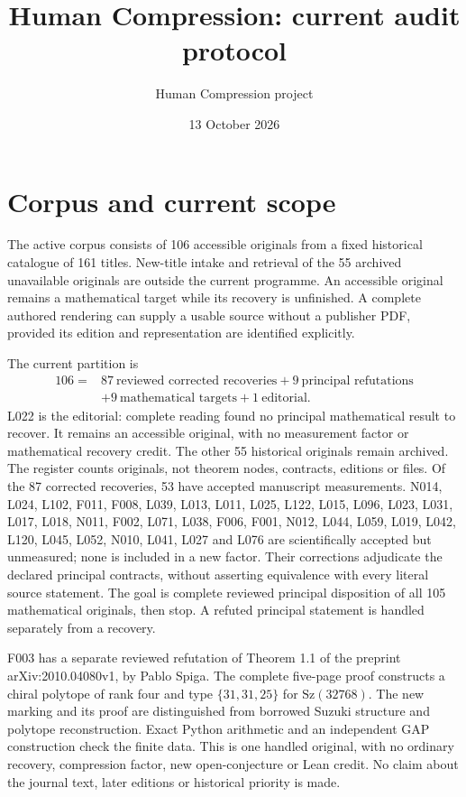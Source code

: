 \documentclass[11pt,a4paper]{article}
\title{Human Compression: current audit protocol}
\author{Human Compression project}
\date{13 October 2026}
\begin{document}
\maketitle

\section{Corpus and current scope}

The active corpus consists of 106 accessible originals from a fixed historical
catalogue of 161 titles. New-title intake and retrieval of the 55 archived
unavailable originals are outside the current programme. An accessible original
remains a mathematical target while its recovery is unfinished. A complete
authored rendering can supply a usable source without a publisher PDF, provided
its edition and representation are identified explicitly.

The current partition is
\[
\begin{aligned}
106={}&87\ \text{reviewed corrected recoveries}+9\ \text{principal refutations}\\
      &+9\ \text{mathematical targets}+1\ \text{editorial}.
\end{aligned}
\]
L022 is the editorial: complete reading found no principal mathematical result
to recover. It remains an accessible original, with no measurement factor or
mathematical recovery credit. The other 55 historical originals remain archived.
The register counts originals, not theorem nodes, contracts, editions or files.
Of the 87 corrected recoveries, 53 have accepted manuscript measurements.
N014, L024, L102, F011, F008, L039, L013, L011, L025, L122, L015, L096, L023, L031, L017, L018, N011, F002, L071, L038, F006, F001, N012, L044, L059, L019, L042, L120, L045, L052, N010, L041, L027 and L076 are scientifically accepted but unmeasured; none is included
in a new factor. Their corrections adjudicate the declared principal contracts,
without asserting equivalence with every literal source statement. The goal
is complete reviewed principal disposition of all 105 mathematical originals,
then stop. A refuted principal statement is handled separately from a recovery.

F003 has a separate reviewed refutation of Theorem 1.1 of the preprint
arXiv:2010.04080v1, by Pablo Spiga. The complete five-page proof constructs a
chiral polytope of rank four and type $\{31,31,25\}$ for $\mathrm{Sz}(32768)$.
The new marking and its proof are distinguished from borrowed Suzuki structure
and polytope reconstruction. Exact Python arithmetic and an independent GAP
construction check the finite data. This is one handled original, with no
ordinary recovery, compression factor, new open-conjecture or Lean credit.
No claim about the journal text, later editions or historical priority is made.
\end{document}
